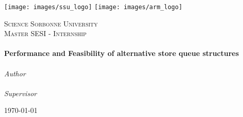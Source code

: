\begin{titlepage}

  \begin{center}
    \texttt{[image: images/ssu\_logo]}
    \hspace{2cm}
    \texttt{[image: images/arm\_logo]}
  \end{center}
  
  \begin{center} 
    \textsc{\LARGE Science Sorbonne University}\\[1.5cm]
    \textsc{\Large Master SESI - Internship}\\[0.5cm]

    \HRule\\[0.4cm]
    {\huge \bfseries Performance and Feasibility of alternative store queue structures\\[0.4cm]}
    \HRule\\[1.5cm]

    \emph{Author}\\[0.1cm]
    \noindent{}\\[1cm]

    \emph{Supervisor}
    \noindent{}

    \vfill

    {\large \today}

  \end{center}
\end{titlepage}
